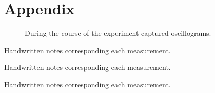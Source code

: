 \chapter{Appendix}
%
\begin{figure}[!ht]%
    \centering
    \hspace{.05\textwidth}
    \hspace{.2\textwidth}
    \hspace{.05\textwidth}
    \hspace{.2\textwidth}
    \caption[Oszillograms]{During the course of the experiment captured oscillograms.}%
    \label{fig:oscillograms}
\end{figure}
%
\newpage
%
\begin{table}[!ht]%
    \centering
    \caption[Handwritten notes]{Handwritten notes corresponding each measurement.}%
    \hspace{2mm}
\end{table}
\begin{table}[!ht]%
    \ContinuedFloat
    \caption[Handwritten notes]{Handwritten notes corresponding each measurement.}%
    \hspace{2mm}%
\end{table}
\begin{table}[!ht]%
    \ContinuedFloat
    \caption[Handwritten notes]{Handwritten notes corresponding each measurement.}%
    \hspace{2mm}%
\end{table}